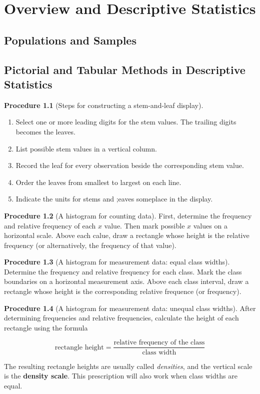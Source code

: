 \documentclass[a4paper]{report}
\theoremstyle{definition}
\newtheorem{procedure}{Procedure}
\theoremstyle{plain}
\begin{document}
\tableofcontents

\chapter{Overview and Descriptive Statistics}
\section{Populations and Samples}
\section{Pictorial and Tabular Methods in Descriptive Statistics}

\begin{procedure}[Steps for constructing a stem-and-leaf display]
\begin{enumerate} 
  \item Select one or more leading digits for the stem values.
        The trailing digits becomes the leaves.
  \item List possible stem values in a vertical column.
  \item Record the leaf for every observation beside the corresponding stem value.
  \item Order the leaves from smallest to largest on each line.
  \item Indicate the units for stems and ;eaves someplace in the display.
\end{enumerate}
\end{procedure}

\begin{procedure}[A histogram for counting data]
  First, determine the frequency and relative frequency of each $x$ value. Then
  mark possible $x$ values on a horizontal scale. Above each calue, draw a
  rectangle whose height is the relative frequency (or alternatively, the
  frequency of that value).
\end{procedure}

\begin{procedure}[A histogram for measurement data: equal class widths]
  Determine the frequency and relative frequency for each class. Mark the class
  boundaries on a horizontal measurement axis.  Above each class interval, draw
  a rectangle whose height is the corresponding relative frequence (or
  frequency).
\end{procedure}

\begin{procedure}[A histogram for measurement data: unequal class widths]
  After determining frequencies and relative frequencies, calculate the height
  of each rectangle using the formula

  \begin{equation*}
    \text{rectangle height} = \frac{\text{relative frequency of the class}}{\text{class width}}
  \end{equation*}

  The resulting rectangle heights are usually called \textit{densities}, and
  the vertical scale is the \textbf{density scale}. This prescription will also
  work when class widths are equal.
\end{procedure}
\end{document}
